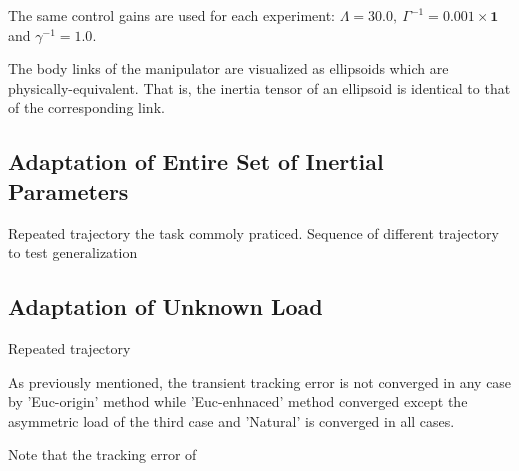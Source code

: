 \documentclass[letterpaper, 10 pt, conference]{ieeeconf}  %
\begin{document}
The same control gains are used for each experiment: $\Lambda = 30.0, ~\Gamma^{-1} = 0.001\times\mathbf{1}$ and $\gamma^{-1} = 1.0$. 

The body links of the manipulator are visualized as ellipsoids which are physically-equivalent. That is, the inertia tensor of an ellipsoid is identical to that of the corresponding link.
\subsection{Adaptation of Entire Set of Inertial Parameters}
Repeated trajectory the task commoly praticed.
Sequence of different trajectory to test generalization

\subsection{Adaptation of Unknown Load}
Repeated trajectory



As previously mentioned, the transient tracking error is not converged in any case by 'Euc-origin' method while 'Euc-enhnaced' method converged except the asymmetric load of the third case and 'Natural' is converged in all cases. 

Note that the tracking error of 
\newpage




\end{document}
